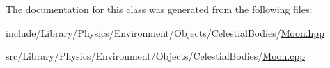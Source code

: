 The documentation for this class was generated from the following files\+:\begin{DoxyCompactItemize}
\item 
include/\+Library/\+Physics/\+Environment/\+Objects/\+Celestial\+Bodies/\hyperlink{_moon_8hpp}{Moon.\+hpp}\item 
src/\+Library/\+Physics/\+Environment/\+Objects/\+Celestial\+Bodies/\hyperlink{_moon_8cpp}{Moon.\+cpp}\end{DoxyCompactItemize}
